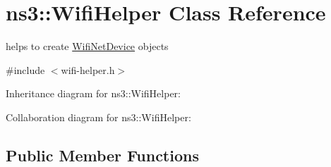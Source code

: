 \hypertarget{classns3_1_1WifiHelper}{}\section{ns3\+:\+:Wifi\+Helper Class Reference}
\label{classns3_1_1WifiHelper}


helps to create \hyperlink{classns3_1_1WifiNetDevice}{Wifi\+Net\+Device} objects  




{\ttfamily \#include $<$wifi-\/helper.\+h$>$}



Inheritance diagram for ns3\+:\+:Wifi\+Helper\+:


Collaboration diagram for ns3\+:\+:Wifi\+Helper\+:
\subsection*{Public Member Functions}
